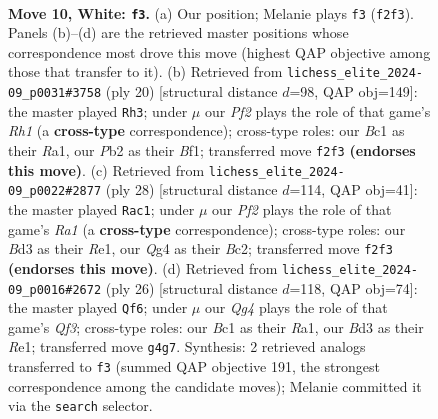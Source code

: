 \documentclass[11pt]{article}
\begin{document}
\clearpage

\begin{figure}[p]\centering
\begin{subfigure}{0.46\textwidth}\centering
\resizebox{\linewidth}{!}{%
\newchessgame
\chessboard[
  setfen={r1b2b1r/pp1nkppp/2n1p3/q2pP3/3P2Q1/3B2P1/PP1N1P1P/R1B1K1NR w KQ - 1 10},
  showmover=false,
  pgfstyle=straightmove, color=movearrow, markmove={f2-f3}
]}
\caption{}
\end{subfigure}\hfill
\begin{subfigure}{0.46\textwidth}\centering
\resizebox{\linewidth}{!}{%
\newchessgame
\chessboard[
  setfen={r3k1nr/pp1b1p2/2n1p1pp/q1ppP3/P2P2QP/2P5/2PB1PP1/R3KBNR w KQkq - 1 11},
  showmover=false,
  pgfstyle=straightmove, color=movearrow, markmove={h1-h3}
]}
\caption{}
\end{subfigure}
\\[4pt]
\begin{subfigure}{0.46\textwidth}\centering
\resizebox{\linewidth}{!}{%
\newchessgame
\chessboard[
  setfen={2r1kb1r/1p1b1ppp/4pn2/p2p4/2qP1B2/P1N2Q2/1PB2PPP/R3R1K1 w k - 3 15},
  showmover=false,
  pgfstyle=straightmove, color=movearrow, markmove={a1-c1}
]}
\caption{}
\end{subfigure}\hfill
\begin{subfigure}{0.46\textwidth}\centering
\resizebox{\linewidth}{!}{%
\newchessgame
\chessboard[
  setfen={r3kb1r/1p1bnp1p/pq2p1p1/3pP3/1P6/P1NB1Q2/1B3PPP/R3R1K1 w kq - 0 14},
  showmover=false,
  pgfstyle=straightmove, color=movearrow, markmove={f3-f6}
]}
\caption{}
\end{subfigure}
\caption{\textbf{Move 10, White: \texttt{f3}.} (a) Our position; Melanie plays \texttt{f3} (\texttt{f2f3}). Panels (b)--(d) are the retrieved master positions whose correspondence most drove this move (highest QAP objective among those that transfer to it). (b) Retrieved from \texttt{lichess\_elite\_2024-09\_p0031\#3758} (ply 20) [structural distance $d$=98, QAP obj=149]: the master played \texttt{Rh3}; under $\mu$ our \emph{Pf2} plays the role of that game's \emph{Rh1} (a \textbf{cross-type} correspondence); cross-type roles: our \emph{B}c1 as their \emph{R}a1, our \emph{P}b2 as their \emph{B}f1; transferred move \texttt{f2f3} \textbf{(endorses this move)}. (c) Retrieved from \texttt{lichess\_elite\_2024-09\_p0022\#2877} (ply 28) [structural distance $d$=114, QAP obj=41]: the master played \texttt{Rac1}; under $\mu$ our \emph{Pf2} plays the role of that game's \emph{Ra1} (a \textbf{cross-type} correspondence); cross-type roles: our \emph{B}d3 as their \emph{R}e1, our \emph{Q}g4 as their \emph{B}c2; transferred move \texttt{f2f3} \textbf{(endorses this move)}. (d) Retrieved from \texttt{lichess\_elite\_2024-09\_p0016\#2672} (ply 26) [structural distance $d$=118, QAP obj=74]: the master played \texttt{Qf6}; under $\mu$ our \emph{Qg4} plays the role of that game's \emph{Qf3}; cross-type roles: our \emph{B}c1 as their \emph{R}a1, our \emph{B}d3 as their \emph{R}e1; transferred move \texttt{g4g7}. Synthesis: 2 retrieved analogs transferred to \texttt{f3} (summed QAP objective 191, the strongest correspondence among the candidate moves); Melanie committed it via the \texttt{search} selector.}
\label{fig:thought-m18}
\end{figure}
\end{document}
